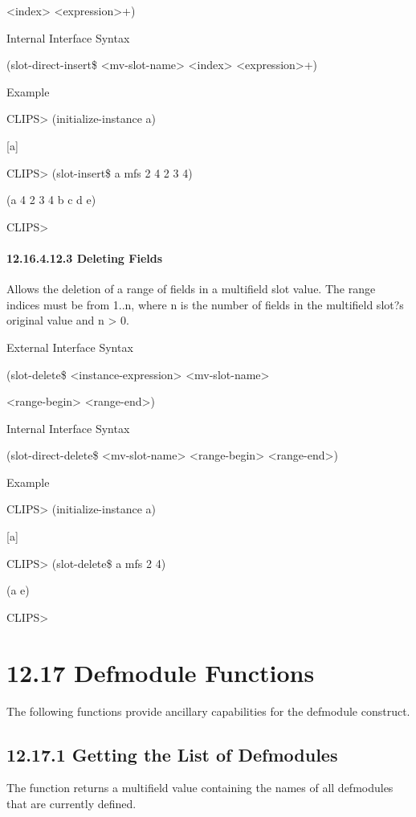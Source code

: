 \documentclass[letterpaper,10pt,english]{sphinxmanual}
\begin{document}
\textless{}index\textgreater{} \textless{}expression\textgreater{}+)

Internal Interface Syntax

(slot-direct-insert\$ \textless{}mv-slot-name\textgreater{} \textless{}index\textgreater{} \textless{}expression\textgreater{}+)

Example

CLIPS\textgreater{} (initialize-instance a)

{[}a{]}

CLIPS\textgreater{} (slot-insert\$ a mfs 2 4 2 3 4)

(a 4 2 3 4 b c d e)

CLIPS\textgreater{}


\paragraph{12.16.4.12.3 Deleting Fields}
\label{\detokenize{actions:deleting-fields}}
Allows the deletion of a range of fields in a multifield slot value. The
range indices must be from 1..n, where n is the number of fields in the
multifield slot?s original value and n \textgreater{} 0.

External Interface Syntax

(slot-delete\$ \textless{}instance-expression\textgreater{} \textless{}mv-slot-name\textgreater{}

\textless{}range-begin\textgreater{} \textless{}range-end\textgreater{})

Internal Interface Syntax

(slot-direct-delete\$ \textless{}mv-slot-name\textgreater{} \textless{}range-begin\textgreater{} \textless{}range-end\textgreater{})

Example

CLIPS\textgreater{} (initialize-instance a)

{[}a{]}

CLIPS\textgreater{} (slot-delete\$ a mfs 2 4)

(a e)

CLIPS\textgreater{}


\section{12.17 Defmodule Functions}
\label{\detokenize{actions:defmodule-functions}}
The following functions provide ancillary capabilities for the defmodule
construct.


\subsection{12.17.1 Getting the List of Defmodules}
\label{\detokenize{actions:getting-the-list-of-defmodules}}
The function  returns a multifield value
containing the names of all defmodules that are currently defined.
\end{document}
